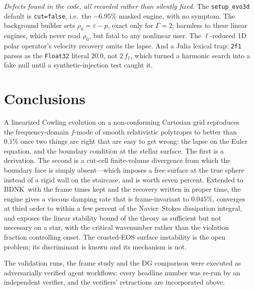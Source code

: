 \documentclass[aps,prd,reprint,amsmath,amssymb,nofootinbib,longbibliography,superscriptaddress]{revtex4-2}
\newcommand{\BDNK}{BDNK}
\begin{document}
\emph{Defects found in the code, all recorded rather than silently fixed.} The
\texttt{setup\_evo3d} default is \texttt{cut=false}, i.e.\ the $-6.95\%$ masked engine, with no
symptom. The background builder sets $\rho_0 = \varepsilon-p$, exact only for $\Gamma=2$; harmless
to these linear engines, which never read $\rho_0$, but fatal to any nonlinear user. The
$\ell$-reduced 1D polar operator's velocity recovery omits the lapse. And a Julia lexical trap:
\texttt{2f1} parses as the \texttt{Float32} literal $20.0$, not $2\,f_1$, which turned a
harmonic search into a fake null until a synthetic-injection test caught it.

\section{Conclusions}

A linearized Cowling evolution on a non-conforming Cartesian grid reproduces the frequency-domain
$f$-mode of smooth relativistic polytropes to better than $0.1\%$ once two things are right that
are easy to get wrong: the lapse on the Euler equation, and the boundary condition at the stellar
surface. The first is a derivation. The second is a cut-cell finite-volume divergence from which
the boundary face is simply absent---which imposes a free surface at the true sphere instead of a
rigid wall on the staircase, and is worth seven percent. Extended to \BDNK\ with the frame times
kept and the recovery written in proper time, the engine gives a viscous damping rate that is
frame-invariant to $0.045\%$, converges at third order to within a few percent of the
Navier--Stokes dissipation integral, and exposes the linear stability bound of the theory as
sufficient but not necessary on a star, with the critical wavenumber rather than the violation
fraction controlling onset. The crusted-EOS surface instability is the open problem; its
discriminant is known and its mechanism is not.

\begin{acknowledgments}
The validation runs, the frame study and the DG comparison were executed as adversarially
verified agent workflows: every headline number was re-run by an independent verifier, and the
verifiers' retractions are incorporated above.
\end{acknowledgments}
\end{document}

